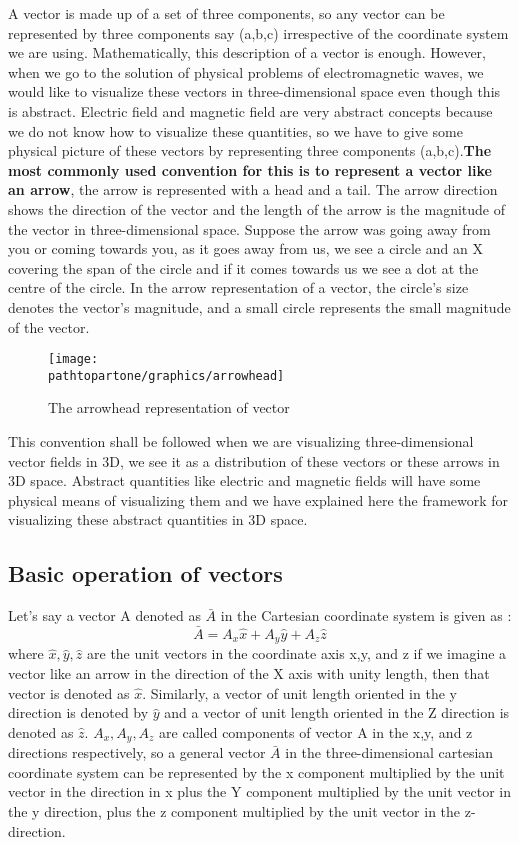 A vector is made up of a set of three components, so any vector can be represented by three components say (a,b,c) irrespective of the coordinate system we are using. Mathematically, this description of a vector is enough. However, when we go to the solution of physical problems of electromagnetic waves, we would like to visualize these vectors in three-dimensional space even though this is abstract. Electric field and magnetic field are very abstract concepts because we do not know how to visualize these quantities, so we have to give some physical picture of these vectors by representing three components (a,b,c).\textbf{The most commonly used convention for this is to represent a vector like an arrow}, the arrow is represented with a head and a tail. The arrow direction shows the direction of the vector and the length of the arrow is the magnitude of the vector in three-dimensional space. Suppose the arrow was going away from you or coming towards you, as it goes away from us, we see a circle and an \textgravedbl X \textacutedbl covering the span of the circle and if it comes towards us we see a dot at the centre of the circle. In the arrow representation of a vector, the circle's size denotes the vector's magnitude, and a small circle represents the small magnitude of the vector.
\begin{figure}[h]
\centering
\texttt{[image: \\pathtopartone/graphics/arrowhead]}
\caption{The arrowhead representation of vector}
\end{figure}

This convention shall be followed when we are visualizing three-dimensional vector fields in 3D, we see it as a distribution of these vectors or these arrows in 3D space. Abstract quantities like electric and magnetic fields will have some physical means of visualizing them and we have explained here the framework for visualizing these abstract quantities in 3D space.  

\subsection{Basic operation of vectors}
Let's say a vector A denoted as $\bar{A}$ in the Cartesian coordinate system is given as :
\begin{equation}
\bar{A} = A_{x}\hat{x} + A_{y}\hat{y} + A_{z}\hat{z} 
\end{equation}
where $\hat{x},\hat{y},\hat{z}$ are the unit vectors in the coordinate axis x,y, and z if we imagine a vector like an arrow in the direction of the X axis with unity length, then that vector is denoted as $\hat{x}$. Similarly, a vector of unit length oriented in the y direction is denoted by $\hat{y}$ and a vector of unit length oriented in the Z direction is denoted as $\hat{z}$. $A_{x}, A_{y}, A_{z}$ are called components of vector A in the x,y, and z directions respectively, so a general vector $\bar{A}$ in the three-dimensional cartesian coordinate system can be represented by the x component multiplied by the unit vector in the direction in x plus the Y component multiplied by the unit vector in the y direction, plus the z component multiplied by the unit vector in the z-direction.

